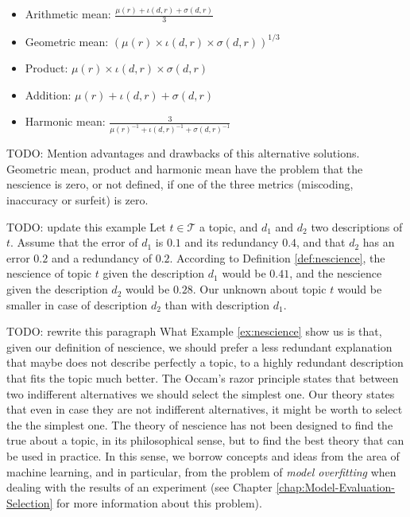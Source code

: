 \begin{itemize}
\item Arithmetic mean: $\frac{\mu(r) + \iota(d, r) + \sigma(d, r)}{3}$
\item Geometric mean: $\left( \mu(r) \times \iota(d, r) \times \sigma(d, r) \right)^{1/3}$
\item Product: $\mu(r) \times \iota(d, r) \times \sigma(d, r)$
\item Addition: $\mu(r) + \iota(d, r) + \sigma(d, r)$
\item Harmonic mean: $\frac{3}{ \mu(r)^{-1} + \iota(d, r)^{-1} + \sigma(d, r)^{-1} }$
\end{itemize}

{\color{red} TODO: Mention advantages and drawbacks of this alternative solutions.} Geometric mean, product and harmonic mean have the problem that the nescience is zero, or not defined, if one of the three metrics (miscoding, inaccuracy or surfeit) is zero.

\begin{example}
\label{ex:nescience}
{\color{red} TODO: update this example} Let $t \in \mathcal{T}$ a topic, and $d_1$ and $d_2$ two descriptions of $t$. Assume that the error of $d_1$ is $0.1$ and its redundancy $0.4$, and that $d_2$ has an error $0.2$ and a redundancy of $0.2$. According to Definition \ref{def:nescience}, the nescience of topic $t$ given the description $d_1$ would be $0.41$, and the nescience given the description $d_2$ would be $0.28$. Our unknown about topic $t$ would be smaller in case of description $d_2$ than with description $d_1$.
\end{example}

{\color{red} TODO: rewrite this paragraph} What Example \ref{ex:nescience} show us is that, given our definition of nescience, we should prefer a less redundant explanation that maybe does not describe perfectly a topic, to a highly redundant description that fits the topic much better. The Occam's razor principle states that between two indifferent alternatives we should select the simplest one. Our theory states that even in case they are not indifferent alternatives, it might be worth to select the the simplest one. The theory of nescience has not been designed to find the true about a topic, in its philosophical sense, but to find the best theory that can be used in practice. In this sense, we borrow concepts and ideas from the area of machine learning, and in particular, from the problem of \emph{model overfitting} when dealing with the results of an experiment (see Chapter \ref{chap:Model-Evaluation-Selection} for more information about this problem).

